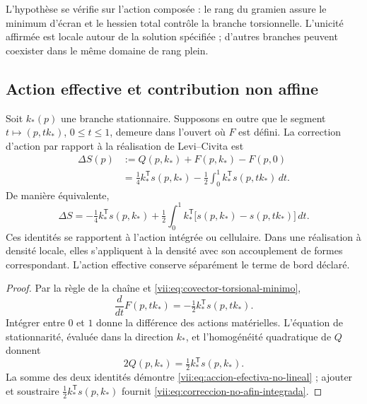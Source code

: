 L'hypothèse se vérifie sur l'action composée : le rang du
gramien assure le minimum d'écran et le hessien total contrôle
la branche torsionnelle. L'unicité affirmée est locale autour de la
solution spécifiée ; d'autres branches peuvent coexister dans le même
domaine de rang plein.

\subsection{Action effective et contribution non affine}
\label{vii:subsec:accion-efectiva-no-afin}

\begin{theorem}
\label{vii:thm:eliminacion-torsional-no-lineal}
Soit \(k_*(p)\) une branche stationnaire. Supposons en outre que le
segment \(t\mapsto (p,tk_*)\), \(0\leq t\leq1\), demeure
dans l'ouvert où \(F\) est défini. La correction d'action
par rapport à la réalisation de Levi--Civita est
\begin{equation}
 \begin{split}
 \Delta S(p)
  &:=Q(p,k_*)+F(p,k_*)-F(p,0)\\
  &=\tfrac14 k_*^{\mathsf T}s(p,k_*)
     -\tfrac12\int_0^1
           k_*^{\mathsf T}s(p,tk_*)\,dt.
 \end{split}
 \label{vii:eq:accion-efectiva-no-lineal}
\end{equation}
De manière équivalente,
\begin{equation}
 \Delta S=-\tfrac14 k_*^{\mathsf T}s(p,k_*)
  +\tfrac12\int_0^1 k_*^{\mathsf T}
       \bigl[s(p,k_*)-s(p,tk_*)\bigr]\,dt.
 \label{vii:eq:correccion-no-afin-integrada}
\end{equation}
Ces identités se rapportent à l'action intégrée ou cellulaire. Dans une réalisation à densité locale, elles s'appliquent à la densité avec son accouplement de formes correspondant. L'action effective conserve séparément le terme de bord déclaré.
\end{theorem}

\begin{proof}
Par la règle de la chaîne et
\eqref{vii:eq:covector-torsional-minimo},
\[
 \frac{d}{dt}F(p,tk_*)
      =-\tfrac12 k_*^{\mathsf T}s(p,tk_*).
\]
Intégrer entre \(0\) et \(1\) donne la différence des actions
matérielles. L'équation de stationnarité, évaluée dans la
direction \(k_*\), et l'homogénéité quadratique de \(Q\) donnent
\[
 2Q(p,k_*)=\tfrac12 k_*^{\mathsf T}s(p,k_*).
\]
La somme des deux identités démontre
\eqref{vii:eq:accion-efectiva-no-lineal} ; ajouter et soustraire
\(\tfrac12k_*^{\mathsf T}s(p,k_*)\) fournit
\eqref{vii:eq:correccion-no-afin-integrada}.
\end{proof}

